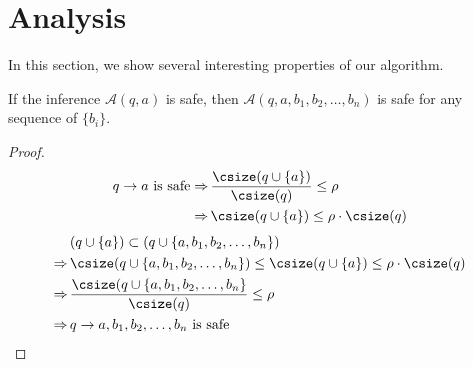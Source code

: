 \section{Analysis}
\label{sec:analysis}

%

In this section, we show several interesting properties of our algorithm.


\begin{lemma}
\label{lemma:rule}
  If the inference $\mathcal{A}(q,a)$ is safe,
  then  $\mathcal{A}(q,a, b_1,b_2,\dots,b_n)$ is safe for any sequence of $\{b_i\}$.
\end{lemma}
\begin{proof}
  \begin{align*}
    \text{$q\rightarrow a$ is safe}
    \Rightarrow
    &\, \frac{\csize(q\cup\{a\})}{\csize(q)} \le \rho \\
    \Rightarrow
    &\, \csize(q\cup\{a\}) \le \rho\cdot\csize(q)
  \end{align*}
  \begin{align*}
    &\, (q\cup\{a\}) \subset (q\cup\{a, b_1,b_2,\dots,b_n\}) \\
    \Rightarrow
    &\,  \csize(q\cup\{a, b_1,b_2,\dots,b_n\}) \leq \csize(q\cup\{a\}) \le \rho\cdot\csize(q) \\
    \Rightarrow
    &\, \frac{\csize(q\cup\{a, b_1,b_2,\dots,b_n\}}{\csize(q)} \le \rho \\
    \Rightarrow
    &\, \text{$q\rightarrow a, b_1,b_2,\dots,b_n$ is safe}
  \end{align*}
\end{proof}

